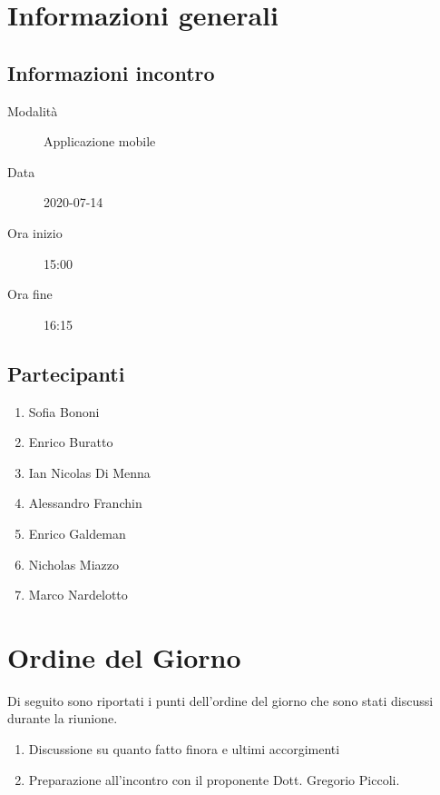 \documentclass{article}
\begin{document}


\section{Informazioni generali}%
\label{sec:informazioni_generali}

\subsection{Informazioni incontro}%
\label{sub:informazioni_incontro}

\begin{description}
  \item[Modalità] Applicazione mobile 
  \item[Data] 2020-07-14
  \item[Ora inizio] 15:00
  \item[Ora fine] 16:15
\end{description}

\subsection{Partecipanti}%
\label{sub:partecipanti}

\begin{enumerate}
  \item Sofia Bononi
  \item Enrico Buratto
  \item Ian Nicolas Di Menna
  \item Alessandro Franchin
  \item Enrico Galdeman
  \item Nicholas Miazzo
  \item Marco Nardelotto
\end{enumerate}

\section{Ordine del Giorno}%
\label{ordine_del_giorno}
Di seguito sono riportati i punti dell'ordine del giorno che sono stati discussi durante la riunione.
\begin{enumerate}
  \item Discussione su quanto fatto finora e ultimi accorgimenti
  \item Preparazione all'incontro con il proponente Dott. Gregorio Piccoli.
\end{enumerate}
\end{document}
